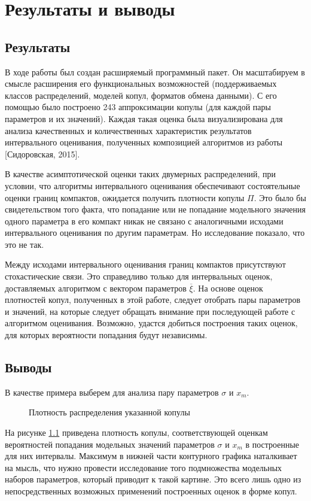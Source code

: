 \chapter{Результаты и выводы}	%

\section*{Результаты}

В ходе работы был создан расширяемый программный пакет. Он масштабируем в смысле расширения его функциональных возможностей (поддерживаемых классов распределений, моделей копул, форматов обмена данными). С его помощью было построено 243 аппроксимации копулы (для каждой пары параметров и их значений). Каждая такая оценка была визуализирована для анализа качественных и количественных характеристик результатов интервального оценивания, полученных композицией алгоритмов из работы [Сидоровская, 2015].

В качестве асимптотической оценки таких двумерных распределений, при условии, что алгоритмы интервального оценивания обеспечивают состоятельные оценки границ компактов, ожидается получить плотности копулы $\Pi$. Это было бы свидетельством того факта, что попадание или не попадание модельного значения одного параметра в его компакт никак не связано с аналогичными исходами интервального оценивания по другим параметрам. Но исследование показало, что это не так.

Между исходами интервального оценивания границ компактов присутствуют стохастические связи.
Это справедливо только для интервальных оценок, доставляемых алгоритмом с вектором параметров $\overline{\xi}$. На основе оценок плотностей копул, полученных в этой работе, следует отобрать пары параметров и значений, на которые следует обращать внимание при последующей работе с алгоритмом оценивания. Возможно, удастся добиться построения таких оценок, для которых вероятности попадания будут независимы.


\section*{Выводы}

В качестве примера выберем для анализа пару параметров $\sigma$ и $x_m$.
\begin{figure}[h]
	{}
	\caption{ Плотность распределения указанной копулы}
	\label{fig:smallxm}
\end{figure}
На рисунке \ref{fig:smallxm} приведена плотность копулы, соответствующей оценкам вероятностей попадания модельных значений параметров $\sigma$ и $x_m$ в построенные для них интервалы.
Максимум в нижней части контурного графика наталкивает на мысль, что нужно провести исследование того подмножества модельных наборов параметров, который приводит к такой картине. Это всего лишь одно из непосредственных возможных применений построенных оценок в форме копул.

